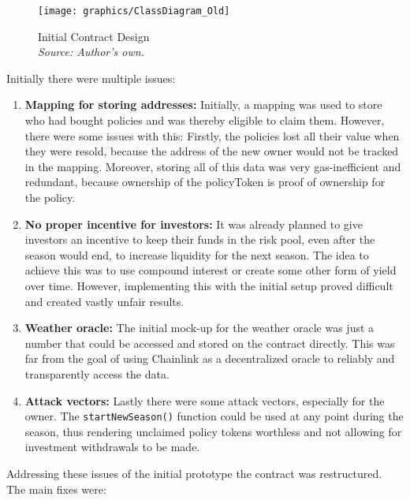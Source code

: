 \documentclass[11pt,a4paper]{article}
\begin{document}
        \begin{figure}[htbp]
            \centering
            \texttt{[image: graphics/ClassDiagram\_Old]}
            \caption{Initial Contract Design \\ \textit{Source: Author's own.}}
            \label{fig:initial-contract-design}
        \end{figure}


        \pagebreak

        Initially there were multiple issues:

		\begin{enumerate}[1]
		\item \textbf{Mapping for storing addresses:} Initially, a mapping was used to store who had bought policies and was thereby eligible to claim them.
		However, there were some issues with this: Firstly, the policies lost all their value when they were resold, because the address of the new owner would not be tracked in the mapping.
		Moreover, storing all of this data was very gas-inefficient and redundant, because ownership of the policyToken is proof of ownership for the policy.
		\item \textbf{No proper incentive for investors:} It was already planned to give investors an incentive to keep their funds in the risk pool, even after the season would end, to increase liquidity for the next season.
		The idea to achieve this was to use compound interest or create some other form of yield over time.
		However, implementing this with the initial setup proved difficult and created vastly unfair results.
		\item \textbf{Weather oracle:} The initial mock-up for the weather oracle was just a number that could be accessed and stored on the contract directly.
		This was far from the goal of using Chainlink as a decentralized oracle to reliably and transparently access the data.
		\item \textbf{Attack vectors:} Lastly there were some attack vectors, especially for the owner.
		The \texttt{startNewSeason()} function could be used at any point during the season, thus rendering unclaimed policy tokens worthless and not allowing for investment withdrawals to be made.
		\end{enumerate}

		Addressing these issues of the initial prototype the contract was restructured.
		The main fixes were:
\end{document}
